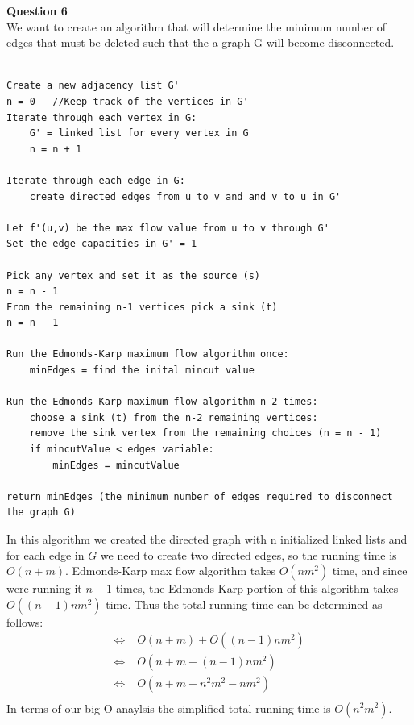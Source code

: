 \documentclass{article}
\begin{document}
\pagebreak
{\bf Question 6}\\
We want to create an algorithm that will determine the minimum number of edges that must be deleted such that the a graph G will become disconnected.
\begin{lstlisting}

Create a new adjacency list G'
n = 0   //Keep track of the vertices in G'
Iterate through each vertex in G:
    G' = linked list for every vertex in G
    n = n + 1

Iterate through each edge in G:
    create directed edges from u to v and and v to u in G'
    
Let f'(u,v) be the max flow value from u to v through G'
Set the edge capacities in G' = 1

Pick any vertex and set it as the source (s)
n = n - 1
From the remaining n-1 vertices pick a sink (t)
n = n - 1

Run the Edmonds-Karp maximum flow algorithm once: 
    minEdges = find the inital mincut value

Run the Edmonds-Karp maximum flow algorithm n-2 times:
    choose a sink (t) from the n-2 remaining vertices:
    remove the sink vertex from the remaining choices (n = n - 1)
    if mincutValue < edges variable:
        minEdges = mincutValue

return minEdges (the minimum number of edges required to disconnect the graph G)
\end{lstlisting}
In this algorithm we created the directed graph with n initialized linked lists and for each edge in $G$ we need to create two directed edges, so the running time is $O(n+m)$. Edmonds-Karp max flow algorithm takes $O(nm^2)$ time, and since were running it $n-1$ times, the Edmonds-Karp portion of this algorithm takes $O((n-1)nm^2)$ time. Thus the total running time can be determined as follows:
\begin{equation*} 
\begin{split}
\Leftrightarrow \; & O(n+m) + O((n-1)nm^2)\\
\Leftrightarrow \; & O(n+m+(n-1)nm^2)\\
\Leftrightarrow \; & O(n+m+n^2m^2-nm^2)\\
\end{split}
\end{equation*}
In terms of our big O anaylsis the simplified total running time is $O(n^2m^2)$.
\end{document}
